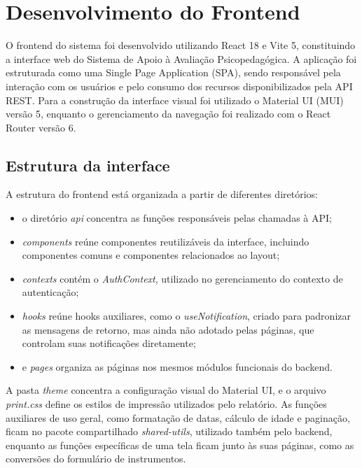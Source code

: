 \section{Desenvolvimento do Frontend}\label{sec:frontend}

O frontend do sistema foi desenvolvido utilizando React 18 e Vite 5, constituindo a interface web do Sistema de Apoio à Avaliação Psicopedagógica. A aplicação foi estruturada como uma Single Page Application (SPA), sendo responsável pela interação com os usuários e pelo consumo dos recursos disponibilizados pela API REST. Para a construção da interface visual foi utilizado o Material UI (MUI) versão 5, enquanto o gerenciamento da navegação foi realizado com o React Router versão 6.

\subsection{Estrutura da interface}

A estrutura do frontend está organizada a partir de diferentes diretórios: 

\begin{itemize}
    \item o diretório \textit{api} concentra as funções responsáveis pelas chamadas à API; 
    \item \textit{components} reúne componentes reutilizáveis da interface, incluindo componentes comuns e componentes relacionados ao layout; 
    \item \textit{contexts} contém o \textit{AuthContext}, utilizado no gerenciamento do contexto de autenticação; 
    \item \textit{hooks} reúne hooks auxiliares, como o \textit{useNotification}, criado para padronizar as mensagens de retorno, mas ainda não adotado pelas páginas, que controlam suas notificações diretamente;
    \item e \textit{pages} organiza as páginas nos mesmos módulos funcionais do backend.
\end{itemize}

A pasta \textit{theme} concentra a configuração visual do Material UI, e o arquivo \textit{print.css} define os estilos de impressão utilizados pelo relatório. As funções auxiliares de uso geral, como formatação de datas, cálculo de idade e paginação, ficam no pacote compartilhado \textit{shared-utils}, utilizado também pelo backend, enquanto as funções específicas de uma tela ficam junto às suas páginas, como as conversões do formulário de instrumentos.

